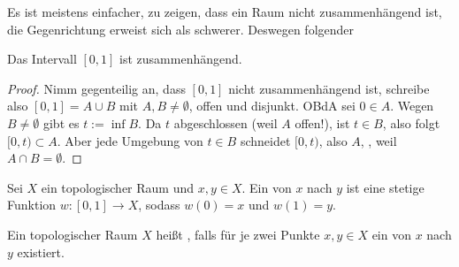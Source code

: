 \begin{remark*}
    Es ist meistens einfacher, zu zeigen, dass ein Raum nicht zusammenhängend ist, die Gegenrichtung erweist sich als schwerer. Deswegen folgender
\end{remark*}

\begin{theorem}[Einheitsintervall]\label{thm:einheitsintervall-ist-zusammenhängend}
    Das Intervall $[0,1]$ ist zusammenhängend.
\end{theorem}

\begin{proof}
    Nimm gegenteilig an, dass $[0,1]$ nicht zusammenhängend ist, schreibe also  $[0,1] = A \cup B$ mit $A,B \neq \emptyset$, offen und disjunkt. OBdA sei $0\in A$. Wegen $B\neq \emptyset$ gibt es $t:= \inf B$. Da  $t$ abgeschlossen (weil  $A$ offen!), ist  $t\in B$, also folgt $[0,t) \subset A$. Aber jede Umgebung von $t\in B$ schneidet $[0,t)$, also  $A$, \contra, weil  $A\cap B = \emptyset$.
\end{proof}

\begin{ddefinition}[Weg]\label{def:weg}
    Sei $X$ ein topologischer Raum und $x,y\in X$. Ein   von $x$ nach $y$ ist eine stetige Funktion $w: [0,1] \to  X$, sodass $w(0) =x$ und  $w(1) = y$. 

    \begin{minipage}{\textwidth}
        \centering
    \end{minipage}
\end{ddefinition}





\begin{definition}[Wegzusammenhang]\label{def:wegzusammenhang}
    Ein topologischer Raum $X$ heißt  , falls für je zwei Punkte $x,y\in X$ ein  von $x$ nach  $y$ existiert.
\end{definition}

